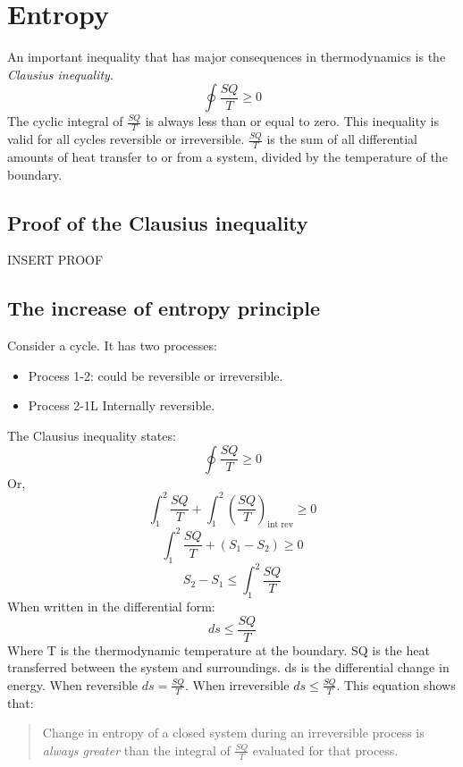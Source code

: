 \documentclass[class=report, crop=false, 12pt,a4paper]{standalone}
\begin{document}
\section{Entropy}
An important inequality that has major consequences in thermodynamics is the \emph{Clausius inequality}.
\[ \oint \frac{SQ}{T} \geq 0 \]
The cyclic integral of \( \frac{SQ}{T} \) is always less than or equal to zero. This inequality is valid for all cycles reversible or irreversible. \( \frac{SQ}{T} \) is the sum of all differential amounts of heat transfer to or from a system, divided by the temperature of the boundary.
\subsection{Proof of the Clausius inequality}
INSERT PROOF
\subsection{The increase of entropy principle}
Consider a cycle. It has two processes:
\begin{itemize}[noitemsep]
  \item Process 1-2: could be reversible or irreversible.
  \item Process 2-1L Internally reversible.
\end{itemize}
The Clausius inequality states:
\[ \oint \frac{SQ}{T} \geq 0 \]
Or,
\[ \int_1^2 \frac{SQ}{T} + \int_1^2\left( \frac{SQ}{T} \right)_{\textrm{int rev}} \geq 0 \]
\[ \int_1^2 \frac{SQ}{T} + (S_1 - S_2) \geq 0 \]
\[ S_2 - S_1 \leq \int_1^2 \frac{SQ}{T} \]
When written in the differential form:
\[ ds \leq \frac{SQ}{T} \]
Where T is the thermodynamic temperature at the boundary. SQ is the heat transferred between the system and surroundings. ds is the differential change in energy. When reversible \( ds = \frac{SQ}{T} \). When irreversible \( ds \leq \frac{SQ}{T} \). This equation shows that:
\begin{quote}
  \begin{center}
    Change in entropy of a closed system during an irreversible process is \emph{always greater} than the integral of \(\frac{SQ}{T}\) evaluated for that process.
  \end{center}
\end{quote}
\end{document}
